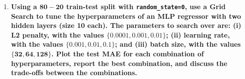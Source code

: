 \documentclass[12pt]{article}
\begin{document}
\begin{enumerate}
\item \textbf{Using a $\mathbf{80-20}$ train-test split with \texttt{random\_state=0}, use a Grid Search to tune the
hyperparameters of an MLP regressor with two hidden layers (size 10 each). The
parameters to search over are: (i) L2 penalty, with the values $\mathbf{\{0.0001, 0.001, 0.01\}}$; (ii)
learning rate, with the values $\mathbf{\{0.001, 0.01, 0.1\}}$; and (iii) batch size, with the values
$\mathbf{\{32, 64, 128\}}$. Plot the test MAE for each combination of hyperparameters, report the
best combination, and discuss the trade-oﬀs between the combinations.}
\end{enumerate}
\end{document}
